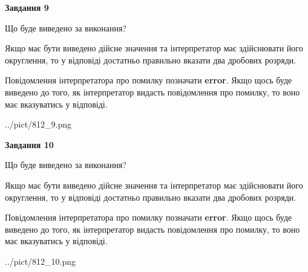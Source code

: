 \documentclass[12pt, ukrainian]{article}
\begin{document}
{\begin {Large}
{\begin {center}\textbf{Завдання 9}\end {center}}\par
Що буде виведено за виконання? \par

Якщо має бути виведено дійсне значення та інтерпретатор має здійснювати його округлення, 
то у відповіді достатньо правильно вказати два дробових розряди.

Повідомлення інтерпретатора про помилку позначати \textbf{error}.
Якщо щось буде виведено до того, як інтерпретатор видасть повідомлення про помилку, 
то воно має вказуватись у відповіді. \par

\begin{center}
	{../pict/812_9.png}
\end{center}
\newpage

{\begin {center}\textbf{Завдання 10}\end {center}}\par
Що буде виведено за виконання? \par

Якщо має бути виведено дійсне значення та інтерпретатор має здійснювати його округлення, 
то у відповіді достатньо правильно вказати два дробових розряди.

Повідомлення інтерпретатора про помилку позначати \textbf{error}.
Якщо щось буде виведено до того, як інтерпретатор видасть повідомлення про помилку, 
то воно має вказуватись у відповіді. \par

\begin{center}
	{../pict/812_10.png}
\end{center}
\newpage

\end {Large}}
\end{document}
